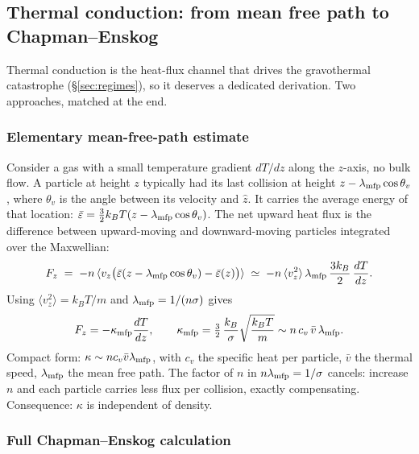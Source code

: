 \documentclass[12pt]{article}
\begin{document}
\subsection{Thermal conduction: from mean free path to Chapman--Enskog}
\label{app:conduction}

Thermal conduction is the heat-flux channel that drives the
gravothermal catastrophe (\S\ref{sec:regimes}), so it deserves a
dedicated derivation.  Two approaches, matched at the end.

\subsubsection{Elementary mean-free-path estimate}

Consider a gas with a small temperature gradient $dT/dz$ along the
$z$-axis, no bulk flow.  A particle at height $z$ typically had its
last collision at height $z - \lambda_{\rm mfp}\cos\theta_v$, where
$\theta_v$ is the angle between its velocity and $\hat z$.  It carries
the average energy of that location:
$\bar\varepsilon = \tfrac{3}{2}k_B T(z - \lambda_{\rm mfp}\cos\theta_v)$.
The net upward heat flux is the difference between upward-moving and
downward-moving particles integrated over the Maxwellian:
%
\begin{equation}
  F_z \;=\; -n\,\langle v_z\bigl(\bar\varepsilon(z-\lambda_{\rm mfp}\cos\theta_v)
        -\bar\varepsilon(z)\bigr)\rangle
    \;\simeq\; -n\,\langle v_z^2\rangle\,\lambda_{\rm mfp}\,
        \frac{3k_B}{2}\,\frac{dT}{dz}.
\end{equation}
%
Using $\langle v_z^2\rangle = k_B T/m$ and
$\lambda_{\rm mfp} = 1/(n\sigma)$ gives
%
\begin{equation}
  F_z = -\kappa_{\rm mfp}\frac{dT}{dz},
  \qquad
  \kappa_{\rm mfp}
    = \tfrac{3}{2}\,\frac{k_B}{\sigma}\sqrt{\frac{k_B T}{m}}
    \sim n\,c_v\,\bar v\,\lambda_{\rm mfp}.
  \label{eq:kappa_mfp}
\end{equation}
%
Compact form: $\kappa \sim n c_v \bar v\lambda_{\rm mfp}$, with $c_v$
the specific heat per particle, $\bar v$ the thermal speed,
$\lambda_{\rm mfp}$ the mean free path.  The factor of $n$ in
$n\lambda_{\rm mfp} = 1/\sigma$ cancels: increase $n$ and each
particle carries less flux per collision, exactly compensating.
Consequence: $\kappa$ is independent of density.

\subsubsection{Full Chapman--Enskog calculation}
\end{document}
